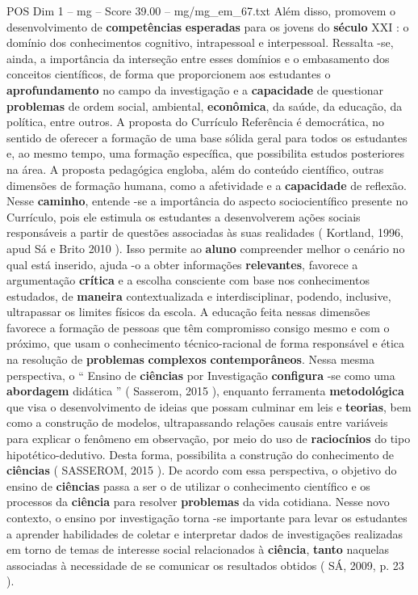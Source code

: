 \begin{textsample}{POS Dim 1 – mg – Score 39.00 – mg/mg\_em\_67.txt}
Além disso, promovem o desenvolvimento de \textbf{competências} \textbf{esperadas} para os jovens do \textbf{século} XXI : o domínio dos conhecimentos cognitivo, intrapessoal e interpessoal.
Ressalta -se, ainda, a importância da interseção entre esses domínios e o embasamento dos conceitos científicos, de forma que proporcionem aos estudantes o \textbf{aprofundamento} no campo da investigação e a \textbf{capacidade} de questionar \textbf{problemas} de ordem social, ambiental, \textbf{econômica}, da saúde, da educação, da política, entre outros.
A proposta do Currículo Referência é democrática, no sentido de oferecer a formação de uma base sólida geral para todos os estudantes e, ao mesmo tempo, uma formação específica, que possibilita estudos posteriores na área.
A proposta pedagógica engloba, além do conteúdo científico, outras dimensões de formação humana, como a afetividade e a \textbf{capacidade} de reflexão.
Nesse \textbf{caminho}, entende -se a importância do aspecto sociocientífico presente no Currículo, pois ele estimula os estudantes a desenvolverem ações sociais responsáveis a partir de questões associadas às suas realidades ( Kortland, 1996, apud Sá e Brito 2010 ).
Isso permite ao \textbf{aluno} compreender melhor o cenário no qual está inserido, ajuda -o a obter informações \textbf{relevantes}, favorece a argumentação \textbf{crítica} e a escolha consciente com base nos conhecimentos estudados, de \textbf{maneira} contextualizada e interdisciplinar, podendo, inclusive, ultrapassar os limites físicos da escola.
A educação feita nessas dimensões favorece a formação de pessoas que têm compromisso consigo mesmo e com o próximo, que usam o conhecimento técnico-racional de forma responsável e ética na resolução de \textbf{problemas} \textbf{complexos} \textbf{contemporâneos}.
Nessa mesma perspectiva, o “ Ensino de \textbf{ciências} por Investigação \textbf{configura} -se como uma \textbf{abordagem} didática ” ( Sasserom, 2015 ), enquanto ferramenta \textbf{metodológica} que visa o desenvolvimento de ideias que possam culminar em leis e \textbf{teorias}, bem como a construção de modelos, ultrapassando relações causais entre variáveis para explicar o fenômeno em observação, por meio do uso de \textbf{raciocínios} do tipo hipotético-dedutivo.
Desta forma, possibilita a construção do conhecimento de \textbf{ciências} ( SASSEROM, 2015 ).
De acordo com essa perspectiva, o objetivo do ensino de \textbf{ciências} passa a ser o de utilizar o conhecimento científico e os processos da \textbf{ciência} para resolver \textbf{problemas} da vida cotidiana.
Nesse novo contexto, o ensino por investigação torna -se importante para levar os estudantes a aprender habilidades de coletar e interpretar dados de investigações realizadas em torno de temas de interesse social relacionados à \textbf{ciência}, \textbf{tanto} naquelas associadas à necessidade de se comunicar os resultados obtidos ( SÁ, 2009, p. 23 ).

\end{textsample}
